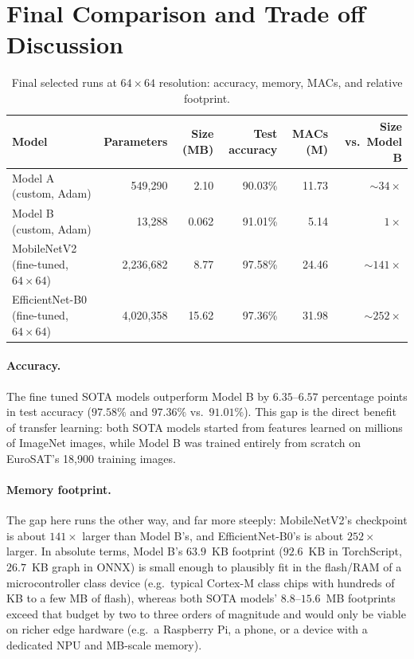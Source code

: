 \documentclass[11pt]{article}
\begin{document}
\section{Final Comparison and Trade off Discussion}
\label{sec:final-comparison}

\begin{table}[H]
\centering
\caption{Final selected runs at $64\times64$ resolution: accuracy, memory, MACs, and relative footprint.}
\label{tab:final-comparison}
\begin{tabular}{lrrrrr}
\toprule
Model & Parameters & Size (MB) & Test accuracy & MACs (M) & Size vs.\ Model B \\
\midrule
Model A (custom, Adam) & 549{,}290 & 2.10 & 90.03\% & 11.73 & $\sim 34\times$ \\
Model B (custom, Adam) & 13{,}288 & 0.062 & 91.01\% & 5.14 & $1\times$ \\
MobileNetV2 (fine-tuned, $64\times64$) & 2{,}236{,}682 & 8.77 & 97.58\% & 24.46 & $\sim 141\times$ \\
EfficientNet-B0 (fine-tuned, $64\times64$) & 4{,}020{,}358 & 15.62 & 97.36\% & 31.98 & $\sim 252\times$ \\
\bottomrule
\end{tabular}
\end{table}

\paragraph{Accuracy.} The fine tuned SOTA models outperform Model B by
$6.35$--$6.57$ percentage points in test accuracy ($97.58\%$ and $97.36\%$ vs.\ $91.01\%$).
This gap is the direct benefit of transfer learning: both SOTA models started from features
learned on millions of ImageNet images, while Model B was trained entirely
from scratch on EuroSAT's 18{,}900 training images.

\paragraph{Memory footprint.} The gap here runs the other way, and far more
steeply: MobileNetV2's checkpoint is about $141\times$ larger than Model
B's, and EfficientNet-B0's is about $252\times$ larger. In absolute terms,
Model B's $63.9$~KB footprint ($92.6$~KB in TorchScript, $26.7$~KB graph in ONNX) is small enough to plausibly fit in the flash/RAM
of a microcontroller class device (e.g.\ typical Cortex-M class chips with
hundreds of KB to a few MB of flash), whereas both SOTA models' $8.8$--$15.6$~MB
footprints exceed that budget by two to three orders of magnitude and would
only be viable on richer edge hardware (e.g.\ a Raspberry Pi, a phone, or a
device with a dedicated NPU and MB-scale memory).
\end{document}
